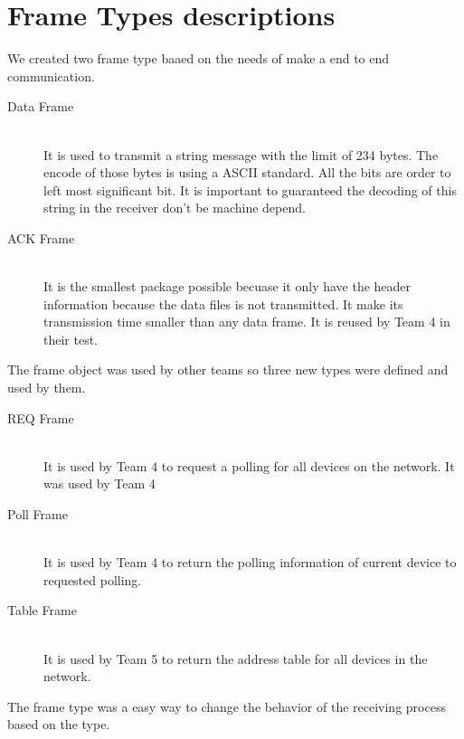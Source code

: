 



\section{Frame Types descriptions}
We created two frame type baaed on the needs of make a end to end communication.

\begin{description}
  \item[Data Frame] \hfill \\
  It is used to transmit a string message with the limit of 234 bytes. The encode of those bytes is using a ASCII standard. All the bits are order to left most significant bit.
	It is important to guaranteed the decoding of this string in the receiver don’t be machine depend. 
	
  \item[ACK Frame] \hfill \\
  It is the smallest package possible becuase it only have the header information because the data files is not transmitted. It make its transmission time smaller than any data frame. It is reused by Team 4 in their test. 
\end{description}

The frame object was used by other teams so three new types were defined and used by them.
\begin{description}
  \item[REQ Frame] \hfill \\
It is used by Team 4 to request a polling for all devices on the network. It was used by Team 4
	
  \item[Poll Frame] \hfill \\
 It is used by Team 4 to return the polling information of current device to requested polling. 
  \item[Table Frame] \hfill \\
 It is used by Team 5 to return the address table for all devices in the network.

\end{description} 

The frame type was a easy way to change the behavior of the receiving process based on the type.  


